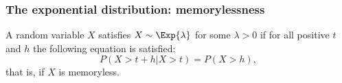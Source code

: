 \documentclass[9pt]{beamer}
\begin{document}
\begin{frame}
\frametitle{The exponential distribution: memorylessness}

\begin{theorem}
A random variable $X$ satisfies $X \sim \Exp{\lambda}$ for some $\lambda > 0$ if for all positive $t$ and $h$ the following equation is satisfied:
\begin{equation*}
P(X > t + h | X > t) = P(X > h),
\end{equation*}
that is, if $X$ is memoryless.
\end{theorem}



\end{frame}









\end{document}
